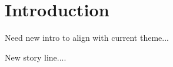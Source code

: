 \section{Introduction}
\label{sec:intro}

\begin{comment}
{\color{blue}
[ANTHONY, SWARUN, BOB]

Key points to cover
\begin{itemize}
\item LPWAN is emerging
\item Unlicensed spectrum $\rightarrow$ uncoordinated
\item Uncoordinated communication with long range $\rightarrow$ poor scaling
\item Coexistence is critical
\item LPWAN is device centric and energy constrained
\item LPWAN is like WiFi (free for all) but in the cellular arena (city-wide/ubiquitous)
\item Contributions are:
\begin{enumerate}
\item Benefits of coordination
\item Network management
\item Techniques and limits of LoRa localization
\item New platforms
\end{enumerate}
\end{itemize}
}
\end{comment}

{\color{red} Need new intro to align with current theme...}


New story line....

